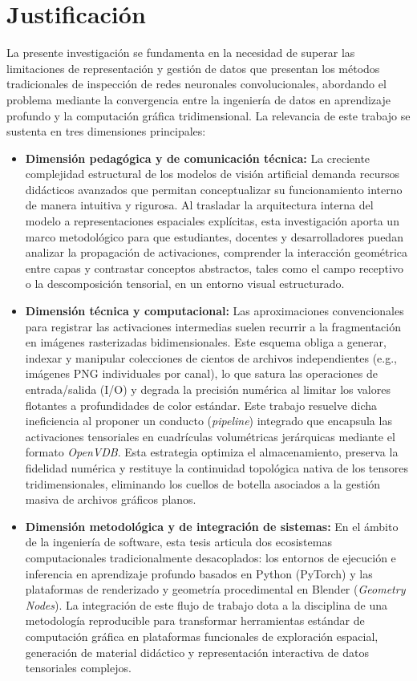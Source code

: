 \section{Justificación}
La presente investigación se fundamenta en la necesidad de superar las limitaciones de representación y gestión de datos 
que presentan los métodos tradicionales de inspección de redes neuronales convolucionales, abordando el problema mediante 
la convergencia entre la ingeniería de datos en aprendizaje profundo y la computación gráfica tridimensional. 
La relevancia de este trabajo se sustenta en tres dimensiones principales:

\begin{itemize}
    \item \textbf{Dimensión pedagógica y de comunicación técnica:} La creciente complejidad estructural de los modelos de 
    visión artificial demanda recursos didácticos avanzados que permitan conceptualizar su funcionamiento interno de manera 
    intuitiva y rigurosa. Al trasladar la arquitectura interna del modelo a representaciones espaciales explícitas, esta 
    investigación aporta un marco metodológico para que estudiantes, docentes y desarrolladores puedan analizar la propagación 
    de activaciones, comprender la interacción geométrica entre capas y contrastar conceptos abstractos, tales como el campo 
    receptivo o la descomposición tensorial, en un entorno visual estructurado.
    
    \item \textbf{Dimensión técnica y computacional:} Las aproximaciones convencionales para registrar las activaciones 
    intermedias suelen recurrir a la fragmentación en imágenes rasterizadas bidimensionales. Este esquema obliga a generar, 
    indexar y manipular colecciones de cientos de archivos independientes (e.g., imágenes PNG individuales por canal), lo que 
    satura las operaciones de entrada/salida (I/O) y degrada la precisión numérica al limitar los valores flotantes a profundidades 
    de color estándar. Este trabajo resuelve dicha ineficiencia al proponer un conducto (\textit{pipeline}) integrado que encapsula 
    las activaciones tensoriales en cuadrículas volumétricas jerárquicas mediante el formato \textit{OpenVDB}. Esta estrategia optimiza 
    el almacenamiento, preserva la fidelidad numérica y restituye la continuidad topológica nativa de los tensores tridimensionales, 
    eliminando los cuellos de botella asociados a la gestión masiva de archivos gráficos planos.
    
    \item \textbf{Dimensión metodológica y de integración de sistemas:} En el ámbito de la ingeniería de software, esta tesis 
    articula dos ecosistemas computacionales tradicionalmente desacoplados: los entornos de ejecución e inferencia en aprendizaje 
    profundo basados en Python (PyTorch) y las plataformas de renderizado y geometría procedimental en Blender (\textit{Geometry Nodes}).
    La integración de este flujo de trabajo dota a la disciplina de una metodología reproducible para transformar herramientas estándar de 
    computación gráfica en plataformas funcionales de exploración espacial, generación de material didáctico y representación interactiva 
    de datos tensoriales complejos.
\end{itemize}